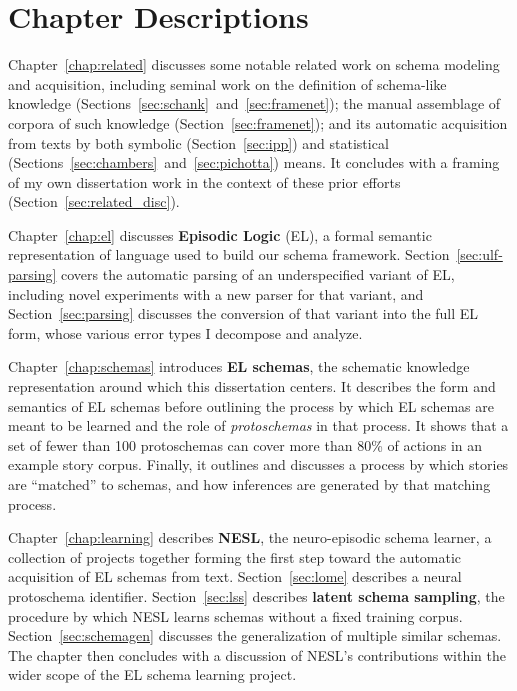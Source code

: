 \section{Chapter Descriptions}
Chapter~\ref{chap:related} discusses some notable related work on schema modeling and acquisition, including seminal work on the definition of schema-like knowledge (Sections~\ref{sec:schank}~and~\ref{sec:framenet}); the manual assemblage of corpora of such knowledge (Section~\ref{sec:framenet}); and its automatic acquisition from texts by both symbolic (Section~\ref{sec:ipp}) and statistical (Sections~\ref{sec:chambers}~and~\ref{sec:pichotta}) means. It concludes with a framing of my own dissertation work in the context of these prior efforts (Section~\ref{sec:related_disc}).

Chapter~\ref{chap:el} discusses \textbf{Episodic Logic} (EL), a formal semantic representation of language used to build our schema framework. Section~\ref{sec:ulf-parsing} covers the automatic parsing of an underspecified variant of EL, including novel experiments with a new parser for that variant, and Section~\ref{sec:parsing} discusses the conversion of that variant into the full EL form, whose various error types I decompose and analyze.

Chapter~\ref{chap:schemas} introduces \textbf{EL schemas}, the schematic knowledge representation around which this dissertation centers. It describes the form and semantics of EL schemas before outlining the process by which EL schemas are meant to be learned and the role of \textit{protoschemas} in that process. It shows that a set of fewer than 100 protoschemas can cover more than 80\% of actions in an example story corpus. Finally, it outlines and discusses a process by which stories are ``matched'' to schemas, and how inferences are generated by that matching process.

Chapter~\ref{chap:learning} describes \textbf{NESL}, the neuro-episodic schema learner, a collection of projects together forming the first step toward the automatic acquisition of EL schemas from text. Section~\ref{sec:lome} describes a neural protoschema identifier. Section~\ref{sec:lss} describes \textbf{latent schema sampling}, the procedure by which NESL learns schemas without a fixed training corpus. Section~\ref{sec:schemagen} discusses the generalization of multiple similar schemas. The chapter then concludes with a discussion of NESL's contributions within the wider scope of the EL schema learning project.

